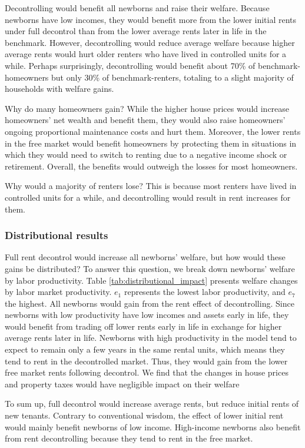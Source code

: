 \documentclass[parskip=full]{article}
\begin{document}
Decontrolling would benefit all newborns and raise their welfare. Because newborns have low incomes, they would benefit more from the lower initial rents under full decontrol than from the lower average rents later in life in the benchmark. However, decontrolling would reduce average welfare because higher average rents would hurt older renters who have lived in controlled units for a while. Perhaps surprisingly, decontrolling would benefit about 70\% of benchmark-homeowners but only 30\% of benchmark-renters, totaling to a slight majority of households with welfare gains. 

Why do many homeowners gain? While the higher house prices would increase homeowners' net wealth and benefit them, they would also raise homeowners' ongoing proportional maintenance costs and hurt them. Moreover, the lower rents in the free market would benefit homeowners by protecting them in situations in which they would need to switch to renting due to a negative income shock or retirement. Overall, the benefits would outweigh the losses for most homeowners.

Why would a majority of renters lose? This is because most renters have lived in controlled units for a while, and decontrolling would result in rent increases for them.  

\subsubsection{Distributional results} 

Full rent decontrol would increase all newborns' welfare, but how would these gains be distributed? To answer this question, we break down newborns' welfare by labor productivity. Table \ref{tab:distributional_impact} presents welfare changes by labor market productivity. $e_{1}$ represents the lowest labor productivity, and $e_{7}$ the highest. All newborns would gain from the rent effect of decontrolling. Since newborns with low productivity have low incomes and assets early in life, they would benefit from trading off lower rents early in life in exchange for higher average rents later in life. Newborns with high productivity in the model tend to expect to remain only a few years in the same rental units, which means they tend to rent in the decontrolled market. Thus, they would gain from the lower free market rents following decontrol. We find that the changes in house prices and property taxes would have negligible impact on their welfare 

To sum up, full decontrol would increase average rents, but reduce initial rents of new tenants. Contrary to conventional wisdom, the effect of lower initial rent would mainly benefit newborns of low income. High-income newborns also benefit from rent decontrolling because they tend to rent in the free market.
\end{document}
